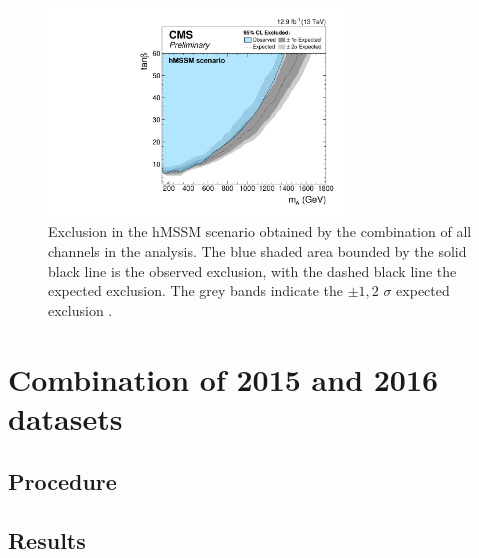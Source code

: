 \begin{figure}[h!]
\begin{center}
\includegraphics[width=0.7\textwidth]{./MSSM/Figures/CMS-PAS-HIG-16-037_Figure_012-b.pdf}
\end{center}
\caption{Exclusion in the hMSSM scenario obtained by the combination
of all channels in the \AHtotautau analysis. The blue shaded area bounded by the 
solid black line is the observed exclusion, with the dashed black line the
expected exclusion. The grey bands indicate the $\pm 1,2$ $\sigma$ 
expected exclusion \cite{CMS-PAS-HIG-16-037}.}
\label{fig:mssm_hmssm_2016}
\end{figure}


\section{Combination of 2015 and 2016 datasets}
\label{sec:mssm_combination}

\subsection{Procedure}
\label{sec:mssm_combination_procedure}

\subsection{Results}
\label{sec:mssm_combination_results}


